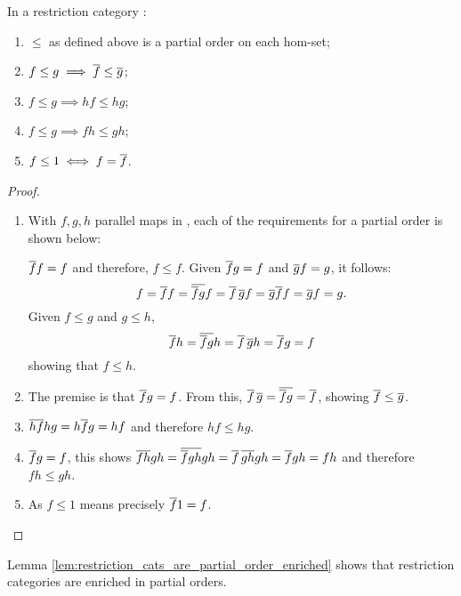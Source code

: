 \begin{lemma}\label{lem:restriction_cats_are_partial_order_enriched}
  In a restriction category \X:
  \begin{enumerate}[{(}i{)}]
    \item  $\le$ as defined  above is a partial order on each hom-set;
    \item $f \le g \implies \overline{f} \le \overline{g}$;
    \item $f \le g \implies h f \le h g$;
    \item $f \le g \implies f h \le g h$;
    \item $f \le 1 \iff f = \overline{f}$.
  \end{enumerate}
\end{lemma}
\begin{proof}
  \prepprooflist
  \begin{enumerate}[{(}i{)}]
    \item With $f,g,h$ parallel maps in \X, each of the requirements for a partial order is 
      shown below:
      \begin{description}
         $\overline{f} f = f$ and therefore, $ f \le f$.
         Given $\overline{f}g = f$ and $\overline{g}f = g$, it follows:
          \[
            f = \overline{f} f = \overline{\overline{f} g} f = \overline{f}\, \overline{g} f
            = \overline{g}\overline{f} f =  \overline{g} f = g.
          \]
         Given $f \le g$ and $g\le h$,
          \[
            \overline{f} h = \overline{\overline{f} g} h = \overline{f}\, \overline{g} h = \overline{f} g = f
          \]
          showing that $f \le h$.
      \end{description}
    \item The premise is that $\overline{f} g = f$. From this,
      $ \overline{f}\, \overline{g} = \overline{\overline{f} g} = \overline{f}$, showing
      $\overline{f} \le \overline{g}$.
    \item $\overline{h f} hg = h \overline{f} g = h f$ and therefore $h f \le hg$.
    \item $\overline{f} g = f$, this shows  $\overline{f h} g h = \overline{\overline{f} g h} g h
      = \overline{f}\, \overline{g h} g h = \overline{f} g h = f h$ and therefore $f h \le g h$.
    \item As $f \le 1$ means precisely $\overline{f}1 = f$.
  \end{enumerate}
\end{proof}

Lemma \vref{lem:restriction_cats_are_partial_order_enriched} shows that restriction 
categories are enriched in partial orders.

